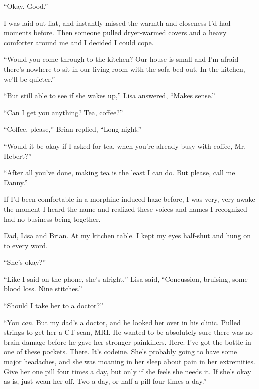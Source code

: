 ``Okay.  Good.''



I was laid out flat, and instantly missed the warmth and closeness I'd had moments before.  Then someone pulled dryer-warmed covers and a heavy comforter around me and I decided I could cope.



``Would you come through to the kitchen?  Our house is small and I'm afraid there's nowhere to sit in our living room with the sofa bed out.  In the kitchen, we'll be quieter.''



``But still able to see if she wakes up,'' Lisa answered, ``Makes sense.''



``Can I get you anything?  Tea, coffee?''



``Coffee, please,'' Brian replied, ``Long night.''



``Would it be okay if I asked for tea, when you're already busy with coffee, Mr. Hebert?''



``After all you've done, making tea is the least I can do.  But please, call me Danny.''



If I'd been comfortable in a morphine induced haze before, I was very, very awake the moment I heard the name and realized these voices and names I recognized had no business being together.



Dad, Lisa and Brian.  At my kitchen table. I kept my eyes half-shut and hung on to every word.



``She's okay?''



``Like I said on the phone, she's alright,'' Lisa said, ``Concussion, bruising, some blood loss.  Nine stitches.''



``Should I take her to a doctor?''



``You \emph{can}.  But my dad's a doctor, and he looked her over in his clinic.  Pulled strings to get her a CT scan, MRI.  He wanted to be absolutely sure there was no brain damage before he gave her stronger painkillers.  Here.  I've got the bottle in one of these pockets.  There.  It's codeine.  She's probably going to have some major headaches, and she was moaning in her sleep about pain in her extremities.  Give her one pill four times a day, but only if she feels she needs it.  If she's okay as is, just wean her off.  Two a day, or half a pill four times a day.''



